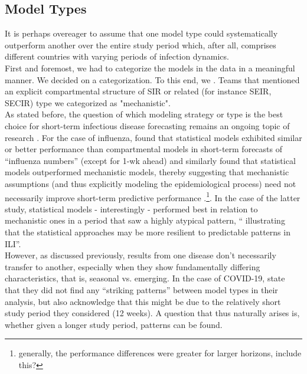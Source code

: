 \subsection{Model Types} \label{sub:model_types_analysis}
It is perhaps overeager to assume that one model type could systematically outperform another over the entire study period which, after all, comprises different countries with varying periods of infection dynamics.\\
First and foremost, we had to categorize the models in the data in a meaningful manner. We decided on a categorization. To this end, we . Teams that mentioned an explicit compartmental structure of SIR or related (for instance SEIR, SECIR) type we categorized as "mechanistic".\\
As stated before, the question of which modeling strategy or type is the best choice for short-term infectious disease forecasting remains an ongoing topic of research \cite{funk_short-term_nodate}. For the case of influenza, \cite{reich_collaborative_2019} found that statistical models exhibited similar or better performance than compartmental models in short-term forecasts of ``influenza numbers'' (except for 1-wk ahead) and \cite{the_influenza_forecasting_working_group_collaborative_2019} similarly found that statistical models outperformed mechanistic models, thereby suggesting that mechanistic assumptions (and thus explicitly modeling the epidemiological process) need not necessarily improve short-term predictive performance \cite{funk_short-term_nodate}.\footnote{generally, the performance differences were greater for larger horizons, include this?}. In the case of the latter study, statistical models - interestingly - performed best in relation to mechanistic ones in a period that saw a highly atypical pattern, `` illustrating that the statistical approaches may be more resilient to predictable patterns in ILI''.\\
However, as discussed previously, results from one disease don't necessarily transfer to another, especially when they show fundamentally differing characteristics, that is, seasonal vs. emerging. In the case of COVID-19, \citep{bracher_evaluating_2021} state that they did not find any ``striking patterns'' between model types in their analysis, but also acknowledge that this might be due to the relatively short study period they considered (12 weeks). A question that thus naturally arises is, whether given a longer study period, patterns can be found.\\
